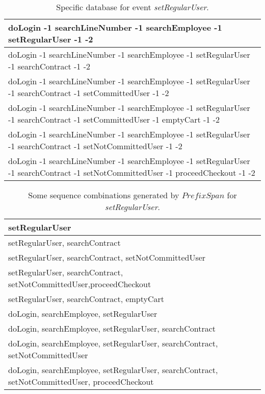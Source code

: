 \begin{table}[]
\begin{center}
\begin{tabular}{|p{15cm}|}

\hline

doLogin -1 searchLineNumber -1 searchEmployee -1 setRegularUser -1 -2 \\ \hline
doLogin -1 searchLineNumber -1 searchEmployee -1 setRegularUser -1 searchContract -1 -2\\ \hline
doLogin -1 searchLineNumber -1 searchEmployee -1 setRegularUser -1 searchContract -1 setCommittedUser -1 -2\\ \hline
doLogin -1 searchLineNumber -1 searchEmployee -1 setRegularUser -1 searchContract -1 setCommittedUser -1 emptyCart -1 -2\\ \hline
doLogin -1 searchLineNumber -1 searchEmployee -1 setRegularUser -1 searchContract -1 setNotCommittedUser -1 -2\\ \hline
doLogin -1 searchLineNumber -1 searchEmployee -1 setRegularUser -1 searchContract -1 setNotCommittedUser -1 proceedCheckout -1 -2\\

\hline
\end{tabular}
\end{center}
\caption{Specific database for event \textit{setRegularUser}.}
\label{specificDatabase}
\end{table}

\begin{table}[]
\begin{center}
\begin{tabular}{|p{15cm}|}

\hline

setRegularUser \\ \hline
setRegularUser, searchContract\\ \hline
setRegularUser, searchContract, setNotCommittedUser\\ \hline
setRegularUser, searchContract, setNotCommittedUser,proceedCheckout\\ \hline
setRegularUser, searchContract, emptyCart\\ \hline
doLogin, searchEmployee, setRegularUser\\ \hline
doLogin, searchEmployee, setRegularUser, searchContract\\ \hline
doLogin, searchEmployee, setRegularUser, searchContract, setNotCommittedUser\\ \hline
doLogin, searchEmployee, setRegularUser, searchContract, setNotCommittedUser, proceedCheckout\\

\hline
\end{tabular}
\end{center}
\caption{Some sequence combinations generated by $PrefixSpan$ for \textit{setRegularUser}.}
\label{combinations}
\end{table}

